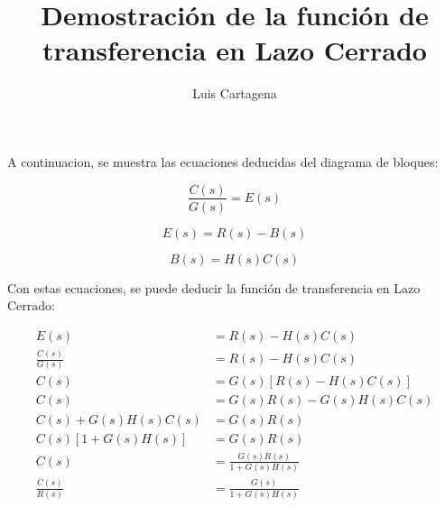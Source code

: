 \documentclass{article}
\title{Demostración de la función de transferencia en Lazo Cerrado}
\author{Luis Cartagena}
\theoremstyle{mytheoremstyle}
\theoremstyle{mytheoremstyle}
\theoremstyle{myproblemstyle}
\begin{document}
    \maketitle

    A continuacion, se muestra las ecuaciones deducidas del diagrama de bloques:
    
    \begin{equation}
        \frac{C(s)}{G(s)} = E(s)
    \end{equation}

    \begin{equation}
        E(s) = R(s)-B(s)
    \end{equation}

    \begin{equation}
        B(s) = H(s)C(s)
    \end{equation}

    Con estas ecuaciones, se puede deducir la función de transferencia en Lazo Cerrado:

    
    \begin{equation*}
        \begin{split}
            E(s)                &=  R(s)-H(s)C(s) \\[1.5ex]
            \frac{C(s)}{G(s)}   &=  R(s)-H(s)C(s) \\[1.5ex]
            C(s)                &=  G(s)[R(s)-H(s)C(s)] \\[1.5ex]
            C(s)                &=  G(s)R(s)-G(s)H(s)C(s) \\[1.5ex]
            C(s)+G(s)H(s)C(s)   &=  G(s)R(s) \\[1.5ex]
            C(s)[1+G(s)H(s)]    &=  G(s)R(s) \\[1.5ex]
            C(s)                &=  \frac{G(s)R(s)}{1+G(s)H(s)} \\[1.5ex]
            \frac{C(s)}{R(s)}   &=  \frac{G(s)}{1+G(s)H(s)}
        \end{split}
    \end{equation*}
\end{document}
